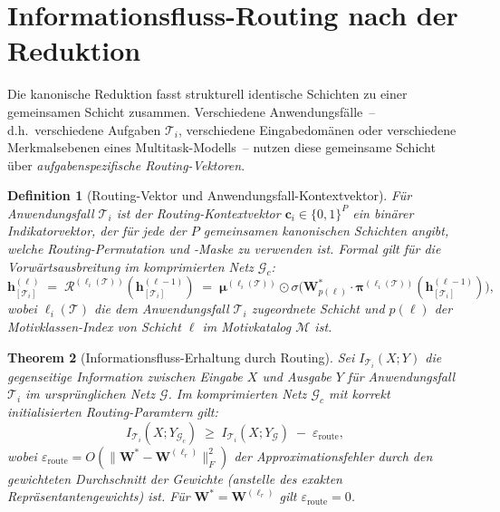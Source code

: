 ﻿\documentclass[12pt, a4paper, openany]{report}
\newtheorem{theorem}{Theorem}[chapter]
\newtheorem{definition}[theorem]{Definition}
\newcommand{\calG}{\mathcal{G}}
\newcommand{\calR}{\mathcal{R}}
\newcommand{\calM}{\mathcal{M}}
\newcommand{\eps}{\varepsilon}
\begin{document}
\section{Informationsfluss-Routing nach der Reduktion}
\label{sec:sgkr_routing}

Die kanonische Reduktion fasst strukturell identische Schichten zu einer
gemeinsamen Schicht zusammen.  Verschiedene Anwendungsfälle~-- d.h.\
verschiedene Aufgaben $\mathcal{T}_i$, verschiedene Eingabedomänen oder
verschiedene Merkmalsebenen eines Multitask-Modells~-- nutzen diese
gemeinsame Schicht über \emph{aufgabenspezifische Routing-Vektoren}.

\begin{definition}[Routing-Vektor und Anwendungsfall-Kontextvektor]
\label{def:routing_vec}
Für Anwendungsfall $\mathcal{T}_i$ ist der \emph{Routing-Kontextvektor}
$\bm{c}_i \in \{0,1\}^P$ ein binärer Indikator\-vektor, der für jede der
$P$ gemeinsamen kanonischen Schichten angibt, welche Routing-Permutation
und -Maske zu verwenden ist.  Formal gilt für die Vorwärtsausbreitung
im komprimierten Netz $\calG_c$:
\begin{equation}
  \label{eq:forward_routed}
  \bm{h}^{(\ell)}_{[\mathcal{T}_i]}
  \;=\;
  \calR^{(\ell_i(\mathcal{T}))}(\bm{h}^{(\ell-1)}_{[\mathcal{T}_i]})
  \;=\;
  \bm{\mu}^{(\ell_i(\mathcal{T}))} \odot
  \sigma\!\bigl(\bm{W}^*_{p(\ell)} \cdot \bm{\pi}^{(\ell_i(\mathcal{T}))}(\bm{h}^{(\ell-1)}_{[\mathcal{T}_i]})\bigr),
\end{equation}
wobei $\ell_i(\mathcal{T})$ die dem Anwendungsfall $\mathcal{T}_i$ zugeordnete
Schicht und $p(\ell)$ der Motivklassen-Index von Schicht $\ell$ im
Motivkatalog $\calM$ ist.
\end{definition}

\begin{theorem}[Informationsfluss-Erhaltung durch Routing]
\label{thm:info_routing}
Sei $I_{\mathcal{T}_i}(X; Y)$ die gegenseitige Information zwischen
Eingabe $X$ und Ausgabe $Y$ für Anwendungsfall $\mathcal{T}_i$ im
ursprünglichen Netz $\calG$.  Im komprimierten Netz $\calG_c$ mit
korrekt initiali\-sierten Routing-Paramtern gilt:
\begin{equation}
  \label{eq:mi_preservation}
  I_{\mathcal{T}_i}(X; Y_{\calG_c})
  \;\geq\;
  I_{\mathcal{T}_i}(X; Y_\calG)
  \;-\;
  \eps_{\mathrm{route}},
\end{equation}
wobei $\eps_{\mathrm{route}} = O(\|\bm{W}^* - \bm{W}^{(\ell_r)}\|_F^2)$ der
Approximationsfehler durch den gewichteten Durchschnitt der Gewichte
(anstelle des exakten Repräsentanten\-gewichts) ist.  Für $\bm{W}^* = \bm{W}^{(\ell_r)}$
gilt $\eps_{\mathrm{route}} = 0$.
\end{theorem}
\end{document}
